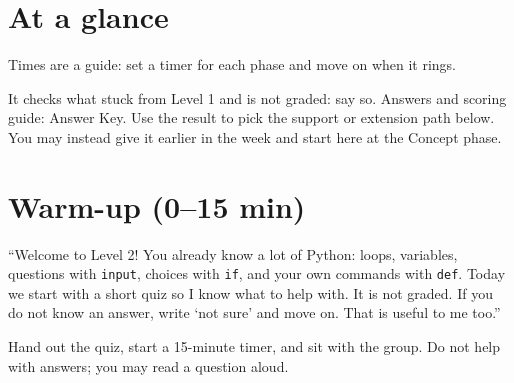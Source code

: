 \section{At a glance}
Times are a guide: set a timer for each phase and move on when it rings.
\begin{timeplan}
\end{timeplan}

\begin{teachernote}
It checks what stuck from Level 1 and is not graded: say so. Answers and scoring guide: Answer Key.
Use the result to pick the support or extension path below. You may instead give it earlier in the week and start here at the Concept phase.
\end{teachernote}

\section{Warm-up (0--15 min)}
\begin{teacherscript}[Say]
\enquote{Welcome to Level 2! You already know a lot of Python: loops, variables, questions with \texttt{input},
choices with \texttt{if}, and your own commands with \texttt{def}. Today we start with a short quiz so I know
what to help with. It is not graded. If you do not know an answer, write \enquote{not sure} and move on. That is
useful to me too.}
\end{teacherscript}
Hand out the quiz, start a 15-minute timer, and sit with the group. Do not help with answers; you may read a question aloud.

